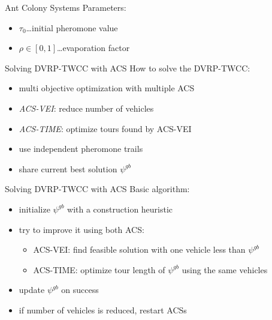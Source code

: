 \begin{frame}{Ant Colony Systems}
  Parameters:
  \begin{itemize}
    \item $\tau_0$\dots initial pheromone value
    \item $\rho \in [0,1]$\dots evaporation factor
  \end{itemize}
  \vspace{5pt}
\end{frame}

\begin{frame}{Solving DVRP-TWCC with ACS}
  How to solve the DVRP-TWCC:
  \begin{itemize}
    \item multi objective optimization with multiple ACS
    \item \emph{ACS-VEI}: reduce number of vehicles
    \item \emph{ACS-TIME}: optimize tours found by ACS-VEI
    \item use independent pheromone trails
    \item share current best solution $\psi^{gb}$
  \end{itemize}

\end{frame}

\begin{frame}{Solving DVRP-TWCC with ACS}
  Basic algorithm:
  \begin{itemize}
    \item initialize $\psi^{gb}$ with a construction heuristic
    \item try to improve it using both ACS:
      \begin{itemize}
        \item ACS-VEI: find feasible solution with one vehicle less than $\psi^{gb}$
	\item ACS-TIME: optimize tour length of $\psi^{gb}$ using the same vehicles
      \end{itemize}
    \item update $\psi^{gb}$ on success
    \item if number of vehicles is reduced, restart ACSs
  \end{itemize}
\end{frame}

